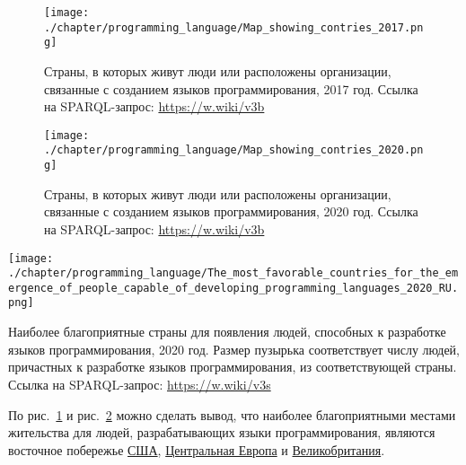 \begin{figure}[h]
\centering
	\texttt{[image: ./chapter/programming\_language/Map\_showing\_contries\_2017.png]}
	\caption[Страны, в которых живут люди или расположены организации, связанные с созданием языков программирования, 2017 год.]{Страны, в которых живут люди или расположены организации, связанные с созданием языков программирования, 2017 год. Ссылка на SPARQL-запрос: \href{https://w.wiki/v3b}{https://w.wiki/v3b}}
	\label{fig:countries_2017}
\end{figure}
\begin{figure}
\centering
	\texttt{[image: ./chapter/programming\_language/Map\_showing\_contries\_2020.png]}
	\caption[Страны, в которых живут люди или расположены организации, связанные с созданием языков программирования, 2020 год.]{Страны, в которых живут люди или расположены организации, связанные с созданием языков программирования, 2020 год. Ссылка на SPARQL-запрос: \href{https://w.wiki/v3b}{https://w.wiki/v3b}}
	\label{fig:countries_2020}
\end{figure}

\begin{marginfigure}
\texttt{[image: ./chapter/programming\_language/The\_most\_favorable\_countries\_for\_the\_emergence\_of\_people\_capable\_of\_developing\_programming\_languages\_2020\_RU.png]}
  \caption[Наиболее благоприятные страны для появления людей, способных к разработке языков программирования, 2020 год.]{Наиболее благоприятные страны для появления людей, способных к разработке языков программирования, 2020 год. Размер пузырька соответствует числу людей, причастных к разработке языков программирования, из соответствующей страны. Ссылка на SPARQL-запрос: \href{https://w.wiki/v3s}{https://w.wiki/v3s}}%
  \label{fig:countries_2_2020}%
\end{marginfigure}
По рис.~\ref{fig:countries_2017} и рис.~\ref{fig:countries_2020} можно сделать вывод, что наиболее благоприятными местами жительства для людей, разрабатывающих языки программирования, являются восточное побережье \href{https://en.wikipedia.org/wiki/USA}{США}, \href{https://ru.wikipedia.org/wiki/Центральная_Европа}{Центральная Европа} и \href{https://ru.wikipedia.org/wiki/Великобритания}{Великобритания}.


